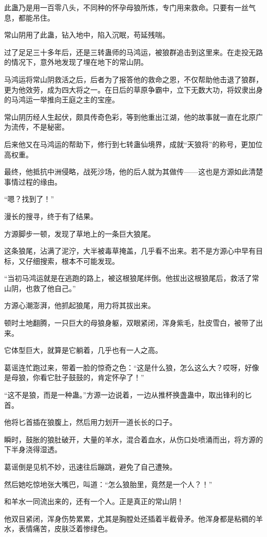 \begin{this_body}
此蛊乃是用一百零八头，不同种的怀孕母狼所炼，专门用来救命。只要有一丝气息，都能吊住。

常山阴用了此蛊，钻入地中，陷入沉眠，苟延残喘。

过了足足三十多年后，还是三转蛊师的马鸿运，被狼群追击到这里来。在走投无路的情况下，意外地发现了埋在地下的常山阴。

马鸿运将常山阴救活之后，后者为了报答他的救命之恩，不仅帮助他击退了狼群，更为他效劳，成为四大将之一。在日后的草原争霸中，立下无数大功，将奴隶出身的马鸿运一举推向王庭之主的宝座。

常山阴历经人生起伏，颇具传奇色彩，等到他重出江湖，他的故事就一直在北原广为流传，不是秘密。

后来他又在马鸿运的帮助下，修行到七转蛊仙境界，成就“天狼将”的称号，更加位高权重。

最终，他抵抗中洲侵略，战死沙场，他的后人就为其做传——这也是方源如此清楚事情过程的缘由。

“嗯？找到了！”

漫长的搜寻，终于有了结果。

方源脚步一顿，发现了草地上的一条巨大狼尾。

这条狼尾，沾满了泥泞，大半被毒草掩盖，几乎看不出来。若不是方源心中早有目标，又仔细搜索，根本不可能发现。

“当初马鸿运就是在逃跑的路上，被这根狼尾绊倒。他拔出这根狼尾后，救活了常山阴，也救了他自己。”

方源心潮澎湃，他抓起狼尾，用力将其拔出来。

顿时土地翻腾，一只巨大的母狼身躯，双眼紧闭，浑身紫毛，肚皮雪白，被带了出来。

它体型巨大，就算是它躺着，几乎也有一人之高。

葛谣连忙跑过来，带着一脸的惊奇之色：“这是什么狼，怎么这么大？哎呀，好像是母狼，你看它肚子鼓鼓的，肯定怀孕了！”

“这不是狼，而是一种蛊。”方源一边说着，一边从推杯换盏蛊中，取出锋利的匕首。

他将匕首插在狼腹上，然后用力划开一道长长的口子。

瞬时，鼓胀的狼肚破开，大量的羊水，混合着血水，从伤口处喷涌而出，将方源的下半身浇得湿透。

葛谣倒是见机不妙，迅速往后蹦跳，避免了自己遭殃。

然后她吃惊地张大嘴巴，叫道：“怎么狼胎里，竟然是一个人？！”

和羊水一同流出来的，还有一个人。正是真正的常山阴！

他双目紧闭，浑身伤势累累，尤其是胸膛处还插着半截骨矛。他浑身都是粘稠的羊水，表情痛苦，皮肤泛着惨绿色。


\end{this_body}
